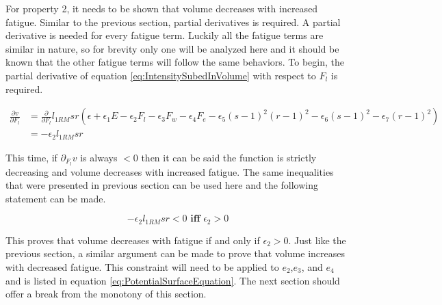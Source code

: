 For property 2, it needs to be shown that volume decreases with increased fatigue. Similar to the previous section, partial derivatives is required. A partial derivative is needed for every fatigue term. Luckily all the fatigue terms are similar in nature, so for brevity only one will be analyzed here and it should be known that the other fatigue terms will follow the same behaviors. To begin, the partial derivative of equation \ref{eq:IntensitySubedInVolume} with respect to $F_l$ is required.

\begin{equation*}
    \begin{split}
    		\frac{\partial v}{\partial F_l} & =
    		\frac{\partial}{\partial F_l} l_{1RM} sr\left( 
    			\epsilon+
    			\epsilon_1 E-
    			\epsilon_2 F_l-
    			\epsilon_3 F_w-
    			\epsilon_4 F_e-
    			\epsilon_5(s-1)^2(r-1)^2-
    			\epsilon_6(s-1)^2-
    			\epsilon_7(r-1)^2
    		\right) \\
    		& = -\epsilon_2 l_{1RM} sr
    \end{split}
\end{equation*}

This time, if $\partial_{F_l}v$ is always $<0$ then it can be said the function is strictly decreasing and volume decreases with increased fatigue. The same inequalities that were presented in previous section can be used here and the following statement can be made.

\begin{equation*}
    -\epsilon_2 l_{1RM} sr< 0 \textbf{ iff } \epsilon_2> 0
\end{equation*}

This proves that volume decreases with fatigue if and only if $\epsilon_2>0$. Just like the previous section, a similar argument can be made to prove that volume increases with decreased fatigue. This constraint will need to be applied to $e_2$,$e_3$, and $e_4$ and is listed in equation \ref{eq:PotentialSurfaceEquation}. The next section should offer a break from the monotony of this section.


